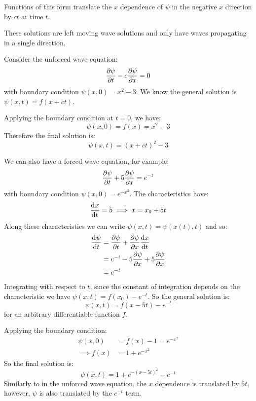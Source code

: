 \documentclass[../main.tex]{subfiles}
\begin{document}
Functions of this form translate the $x$ dependence of $\psi$ in the negative $x$ direction by $ct$ at time $t$.
\begin{center}
\end{center}
These solutions are left moving wave solutions and only have waves propagating in a single direction.
\begin{example}
  Consider the unforced wave equation:
  \[
    \pderiv{\psi}{t} - c \pderiv{\psi}{x} = 0
  \]
  with boundary condition $\psi(x, 0) = x^2 - 3$.
  We know the general solution is $\psi(x, t) = f(x + ct)$.

  Applying the boundary condition at $t = 0$, we have:
  \[
    \psi(x, 0) = f(x) = x^2 - 3
  \]
  Therefore the final solution is:
  \[
    \psi(x, t)  = (x + ct)^2 - 3
  \]
\end{example}
\begin{example}
  We can also have a forced wave equation, for example:
  \[
    \pderiv{\psi}{t} + 5\pderiv{\psi}{x} = e^{-t}
  \]
  with boundary condition $\psi(x, 0) = e^{-x^2}$.
  The characteristics have:
  \[
    \deriv{x}{t} = 5 \implies x = x_0 + 5t
  \]
  Along these characteristics we can write $\psi(x, t) = \psi(x(t), t)$ and so:
  \begin{align*}
    \deriv{\psi}{t} &= \pderiv{\psi}{t}  + \pderiv{\psi}{x} \deriv{x}{t} \\
                    &= e^{-t} - 5\pderiv{\psi}{x} + 5\pderiv{\psi}{x} \\
                    &= e^{-t}
  \end{align*}
  Integrating with respect to $t$, since the constant of integration depends on the characteristic we have $\psi(x, t) = f(x_0) - e^{-t}$.
  So the general solution is:
  \[
    \psi(x, t) = f(x - 5t) - e^{-t}
  \]
  for an arbitrary differentiable function $f$.

  Applying the boundary condition:
  \begin{align*}
    \psi(x, 0) &= f(x) - 1 = e^{-x^2} \\
    \implies f(x) &= 1 + e^{-x^2}
  \end{align*}
  So the final solution is:
  \[
    \psi(x, t) = 1 + e^{-(x - 5t)^2} - e^{-t}
  \]
  Similarly to in the unforced wave equation, the $x$ dependence is translated by $5t$, however, $\psi$ is also translated by the $e^{-t}$ term.
\end{example}
\end{document}
